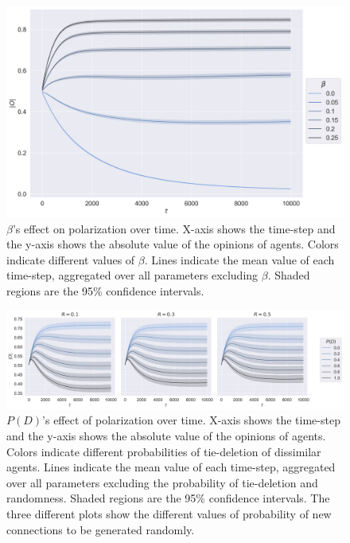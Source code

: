 \documentclass{article}
\begin{document}
\begin{figure}[H]
    \centering
    \includegraphics[width=.8\linewidth]{../plots/overall/Absolute_Opinion_Negative_Learning_Rate.png}
  \caption{$\beta$'s effect on polarization over time. X-axis shows the time-step and the y-axis shows the absolute value of the opinions of agents. Colors indicate different values of $\beta$. Lines indicate the mean value of each time-step, aggregated over all parameters excluding $\beta$. Shaded regions are the 95\% confidence intervals.}
  \label{fig:beta}
\end{figure}

\begin{figure}[H]
    \centering
    \includegraphics[width=.8\linewidth]{../plots/overall/Absolute_Opinion_Tie_Dissolution.png}
  \caption{$P(D)$'s effect of polarization over time. X-axis shows the time-step and the y-axis shows the absolute value of the opinions of agents. Colors indicate different probabilities of tie-deletion of dissimilar agents. Lines indicate the mean value of each time-step, aggregated over all parameters excluding the probability of tie-deletion and randomness. Shaded regions are the 95\% confidence intervals. The three different plots show the different values of probability of new connections to be generated randomly. }
  \label{fig:pd}
\end{figure}
\end{document}
